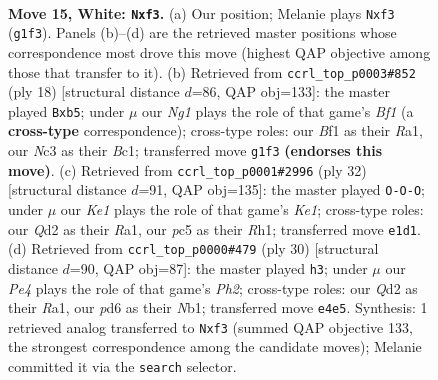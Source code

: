 \documentclass[11pt]{article}
\begin{document}
\clearpage

\begin{figure}[p]\centering
\begin{subfigure}{0.46\textwidth}\centering
\resizebox{\linewidth}{!}{%
\newchessgame
\chessboard[
  setfen={rnbqkbr1/5p2/1p1p1n2/p1pP4/P3P2p/2N1Bp2/RP1Q2PP/4KBNR w Kq - 0 15},
  showmover=false,
  pgfstyle=straightmove, color=movearrow, markmove={g1-f3}
]}
\caption{}
\end{subfigure}\hfill
\begin{subfigure}{0.46\textwidth}\centering
\resizebox{\linewidth}{!}{%
\newchessgame
\chessboard[
  setfen={rnbq1rk1/4ppbp/3p1np1/1ppP4/P3PP2/2N2N2/1P4PP/R1BQKB1R w KQ - 0 10},
  showmover=false,
  pgfstyle=straightmove, color=movearrow, markmove={f1-b5}
]}
\caption{}
\end{subfigure}
\\[4pt]
\begin{subfigure}{0.46\textwidth}\centering
\resizebox{\linewidth}{!}{%
\newchessgame
\chessboard[
  setfen={1rbqr1k1/5pb1/p1p2np1/3p3p/2PBP2P/2NB1P2/PP1Q2P1/R3K2R w KQ - 0 17},
  showmover=false,
  pgfstyle=straightmove, color=movearrow, markmove={e1-c1}
]}
\caption{}
\end{subfigure}\hfill
\begin{subfigure}{0.46\textwidth}\centering
\resizebox{\linewidth}{!}{%
\newchessgame
\chessboard[
  setfen={r1b2rk1/p1q1p1bp/n2pP1p1/2p2P2/PpP3n1/3B1N2/1PQB2PP/RN3RK1 w - - 1 16},
  showmover=false,
  pgfstyle=straightmove, color=movearrow, markmove={h2-h3}
]}
\caption{}
\end{subfigure}
\caption{\textbf{Move 15, White: \texttt{Nxf3}.} (a) Our position; Melanie plays \texttt{Nxf3} (\texttt{g1f3}). Panels (b)--(d) are the retrieved master positions whose correspondence most drove this move (highest QAP objective among those that transfer to it). (b) Retrieved from \texttt{ccrl\_top\_p0003\#852} (ply 18) [structural distance $d$=86, QAP obj=133]: the master played \texttt{Bxb5}; under $\mu$ our \emph{Ng1} plays the role of that game's \emph{Bf1} (a \textbf{cross-type} correspondence); cross-type roles: our \emph{B}f1 as their \emph{R}a1, our \emph{N}c3 as their \emph{B}c1; transferred move \texttt{g1f3} \textbf{(endorses this move)}. (c) Retrieved from \texttt{ccrl\_top\_p0001\#2996} (ply 32) [structural distance $d$=91, QAP obj=135]: the master played \texttt{O-O-O}; under $\mu$ our \emph{Ke1} plays the role of that game's \emph{Ke1}; cross-type roles: our \emph{Q}d2 as their \emph{R}a1, our \emph{p}c5 as their \emph{R}h1; transferred move \texttt{e1d1}. (d) Retrieved from \texttt{ccrl\_top\_p0000\#479} (ply 30) [structural distance $d$=90, QAP obj=87]: the master played \texttt{h3}; under $\mu$ our \emph{Pe4} plays the role of that game's \emph{Ph2}; cross-type roles: our \emph{Q}d2 as their \emph{R}a1, our \emph{p}d6 as their \emph{N}b1; transferred move \texttt{e4e5}. Synthesis: 1 retrieved analog transferred to \texttt{Nxf3} (summed QAP objective 133, the strongest correspondence among the candidate moves); Melanie committed it via the \texttt{search} selector.}
\label{fig:thought-m28}
\end{figure}
\end{document}
